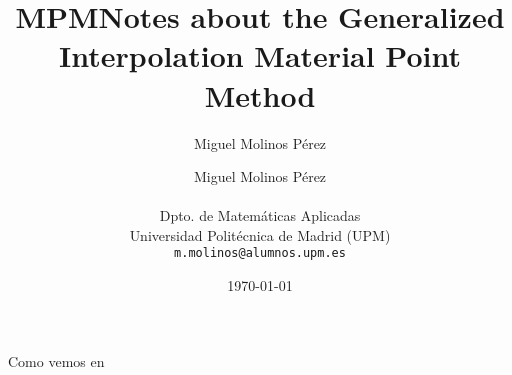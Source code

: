 \documentclass[10pt,a4paper]{article}
\author{Miguel Molinos Pérez}
\title{MPM}
\begin{document}
\title{Notes about the Generalized Interpolation Material Point
  Method} \author{
  Miguel Molinos P\'erez\\ \\
  \small{Dpto. de Matem\'aticas Aplicadas}\\
  \small{Universidad Polit\'ecnica de Madrid (UPM)}\\
  \small{\texttt{m.molinos@alumnos.upm.es}} } \date{\small{\today}}


\maketitle %
\newpage
\tableofcontents











Como vemos en \cite{Tran2019d}






\end{document}

